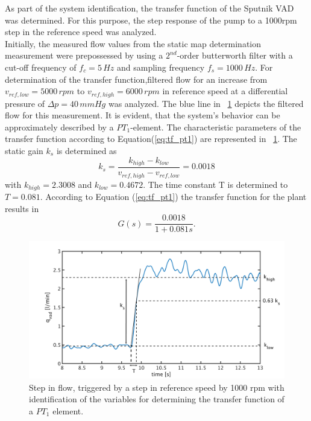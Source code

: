 As part of the system identification, the transfer function of the Sputnik VAD was determined. For this purpose, the step response of the pump to a 1000rpm step in the reference speed was analyzed.
\\Initially, the measured flow values from the static map determination measurement were prepossessed by using a $2^{nd}$-order butterworth filter with a cut-off frequency of $f_c = 5\,Hz$ and sampling frequency $f_s=1000 \, Hz$. For determination of the transfer function,filtered flow for an increase from $v_{ref,low}=5000\,rpm$ to $v_{ref,high}=6000\,rpm$ in reference speed at a differential pressure of $\Delta{p}=40\,mmHg$ was analyzed. The blue line in \figurename~\ref{fig:plant} depicts the filtered flow for this measurement. It is evident, that the system's behavior can be approximately described by a $PT_1$-element.
 The characteristic parameters of the transfer function according to Equation(\ref{eq:tf_pt1}) are represented in \figurename~\ref{fig:plant}. The static gain $k_s$ is determined as
\begin{equation}
  k_s = \frac{k_{high}-k_{low}}{v_{ref,high}-v_{ref,low}}=0.0018
\end{equation}
with $k_{high}=2.3008$ and $k_{low}=0.4672$. The time constant T is determined to $T=0.081$.
According to Equation (\ref{eq:tf_pt1}) the transfer function for the plant results in
\begin{equation}
    G(s) = \frac{0.0018}{1+0.081s}.
 \label{eq:plant}
\end{equation}
\begin{figure}[ht]
  \centering
  \includegraphics[width=\textwidth]{images/plots_syst_ident/plant_generation.pdf}
  \caption[Transfer function of Sputnik VAD]{Step in flow, triggered by a step in reference speed by 1000 rpm with identification of the variables for determining the transfer function of a $PT_1$ element.}
  \label{fig:plant}
\end{figure}
